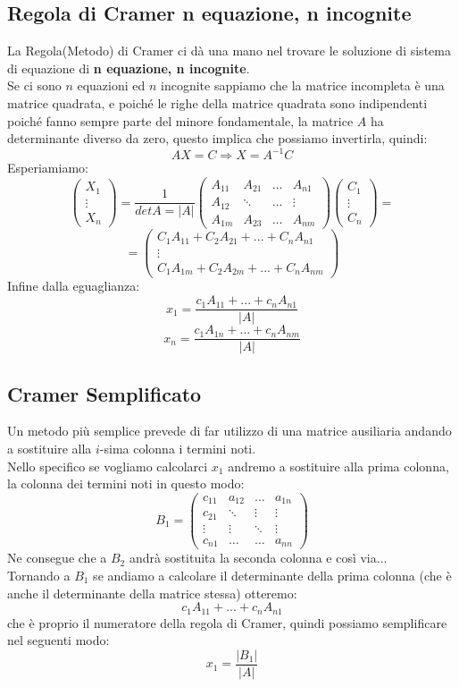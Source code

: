 \subsection{Regola di Cramer n equazione, n incognite}
La Regola(Metodo) di Cramer ci dà una mano nel trovare le soluzione di sistema di equazione di \textbf{n equazione, n incognite}.\\
Se ci sono $n$ equazioni ed $n$ incognite sappiamo che la matrice
incompleta è una matrice quadrata, e poiché le righe della matrice quadrata sono indipendenti poiché fanno sempre parte del minore fondamentale, la matrice $A$ ha determinante diverso da zero, questo implica che possiamo invertirla, quindi:
$$ AX=C \Rightarrow X=A^{-1}C $$
Esperiamiamo:
$$ 
\begin{pmatrix}
X_1 \\ \vdots \\ X_n
\end{pmatrix}
= 
\frac{1}{detA = |A|}
\begin{pmatrix}
A_{11} & A_{21} & \dots & A_{n1} \\
A_{12} & \ddots & \dots & \vdots \\
A_{1m} & A_{23} & \dots & A_{nm}
\end{pmatrix}
\begin{pmatrix}
C_1 \\ \vdots \\ C_n
\end{pmatrix}
=
$$
$$ 
=
\begin{pmatrix}
C_1A_{11}+C_2A_{21}+...+C_nA_{n1} \\
\vdots \\
C_1A_{1m}+C_2A_{2m}+...+C_nA_{nm} 
\end{pmatrix}
$$
Infine dalla eguaglianza:
$$ x_1 = \frac{c_1A_{11}+...+c_nA_{n1}}{|A|} $$
$$ x_n = \frac{c_1A_{1n}+...+c_nA_{nm}}{|A|} $$

\subsection{Cramer Semplificato}
Un metodo più semplice prevede di far utilizzo di una matrice ausiliaria andando a sostituire alla $i$-sima colonna i termini noti.\\
Nello specifico se vogliamo calcolarci $x_1$ andremo a sostituire alla prima colonna, la colonna dei termini noti in questo modo:
$$
B_1 = 
\begin{pmatrix}
c_{11} & a_{12} & \dots & a_{1n} \\
c_{21} & \ddots & \vdots & \vdots \\
\vdots & \vdots & \ddots & \vdots \\
c_{n1} & \dots & \dots & a_{nn}
\end{pmatrix}
$$
Ne consegue che a $B_2$ andrà sostituita la seconda colonna e così via...\\
Tornando a $B_1$ se andiamo a calcolare il determinante della prima colonna (che è anche il determinante della matrice stessa) otteremo:
$$ c_1A_{11}+...+c_nA_{n1} $$
che è proprio il numeratore della regola di Cramer, quindi possiamo semplificare nel seguenti modo:
$$ x_1 = \frac{|B_1|}{|A|} $$

